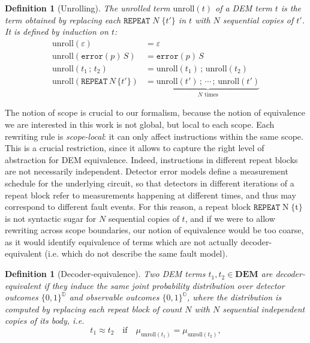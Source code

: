 \documentclass[11pt,a4paper]{article}
\newtheorem{definition}[theorem]{Definition}
\newcommand{\dist}[1]{\mu_{#1}}   %
\newcommand{\unroll}{\mathrm{unroll}} %
\begin{document}
\begin{definition}[Unrolling]
\label{def:unrolling}
The unrolled term $\unroll(t)$ of a DEM term $t$ is the term obtained by replacing each $\mathtt{REPEAT}\;N\;\{t'\}$ in $t$ with $N$ sequential copies of $t'$. It is defined by induction on $t$:
\begin{align*}
  \unroll(\varepsilon) &= \varepsilon \\
  \unroll(\mathtt{error}(p)\,S) &= \mathtt{error}(p)\,S \\
  \unroll(t_1 \,;\, t_2) &= \unroll(t_1) \,;\, \unroll(t_2) \\
  \unroll(\mathtt{REPEAT}\,N\,\{t'\}) &= \underbrace{\unroll(t')\,;\,\cdots\,;\,\unroll(t')}_{N\text{ times}}
\end{align*}
\end{definition}

The notion of scope is crucial to our formalism, because the notion of equivalence we are interested in this work is not global, but local to each scope. Each rewriting rule is \emph{scope-local}: it can only affect instructions within the same scope. This is a crucial restriction, since it allows to capture the right level of abstraction for DEM equivalence. Indeed, instructions in different repeat blocks are not necessarily independent. Detector error models define a measurement schedule for the underlying circuit, so that detectors in different iterations of a repeat block refer to measurements happening at different times, and thus may correspond to different fault events. For this reason, a repeat block $\texttt{REPEAT}\;$N$\;\{$t$\}$ is not syntactic sugar for $N$ sequential copies of $t$, and if we were to allow rewriting across scope boundaries, our notion of equivalence would be too coarse, as it would identify equivalence of terms which are not actually decoder-equivalent (i.e. which do not describe the same fault model).

\begin{definition}[Decoder-equivalence]
\label{def:decoder-equivalence}
Two DEM terms $t_1, t_2 \in \mathbf{DEM}$ are \emph{decoder-equivalent} if they induce the same joint probability distribution over detector outcomes $\{0,1\}^{\mathbb{D}}$ and observable outcomes $\{0,1\}^{\mathbb{O}}$, where the distribution is computed by replacing each repeat block of count $N$ with $N$ sequential independent copies of its body, i.e.
\[
t_1 \approx t_2 \quad\text{if}\quad \dist{\unroll(t_1)} = \dist{\unroll(t_2)},
\]
\end{definition}
\end{document}
